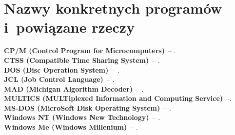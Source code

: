 \documentclass[a4paper,11pt]{article}
\begin{document}











\section{Nazwy konkretnych programów i~powiązane rzeczy}


\textbf{CP/M (Control Program for Microcomputers)}~-- . \\
\textbf{CTSS (Compatible Time Sharing System)}~-- . \\
\textbf{DOS (Disc Operation System)}~-- . \\
\textbf{JCL (Job Control Language)}~-- . \\
\textbf{MAD (Michigan Algorithm Decoder)}~-- . \\
\textbf{MULTICS (MULTiplexed Information and Computing Service)}~--. \\
\textbf{MS-DOS (MicroSoft Disk Operating System)}~-- . \\
\textbf{Windows NT (Windows New Technology)}~-- . \\
\textbf{Windows Me (Windows Millenium)}~-- . \\








\printbibliography





\end{document}
